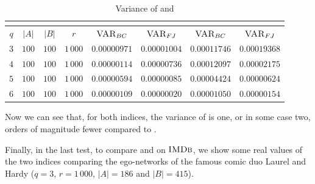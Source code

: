 \begin{table}[ht]
	\centering
	\begin{tabular}{|c|c|c|c|c|c|c|c|}
		\cline{5-8}
		\multicolumn{4}{c|}{} & \multicolumn{2}{c|}{\fsamp} & \multicolumn{2}{c|}{\base}\\
		\hline
		$q$ & $|A|$ & $|B|$ & $r$      & $\textsc{VAR}_{BC}$ & $\textsc{VAR}_{FJ}$ & $\textsc{VAR}_{BC}$ & $\textsc{VAR}_{FJ}$ \\ \hline 
		$3$ & $100$ & $100$ & $1\,000$ & $0.00000971$        & $0.00001004$        & $0.00011746$        & $0.00019368$        \\ \hline
		$4$ & $100$ & $100$ & $1\,000$ & $0.00000114$        & $0.00000736$        & $0.00012097$        & $0.00002175$        \\ \hline
		$5$ & $100$ & $100$ & $1\,000$ & $0.00000594$        & $0.00000085$        & $0.00004424$        & $0.00000624$        \\ \hline
		$6$ & $100$ & $100$ & $1\,000$ & $0.00000109$        & $0.00000020$        & $0.00001050$        & $0.00000154$        \\ \hline
	\end{tabular}
	\caption{Variance of \fsamp and \base}	
\end{table}

Now we can see that, for both indices, the variance of \fsamp is one, or in some case two, orders of magnitude fewer compared to \base.

Finally, in the last test, to compare \fsamp and \base on $\textsc{IMDb}$, we show some real values of the two indices comparing the ego-networks of the famous comic duo Laurel and Hardy
($q=3$, $r=1\,000$, $|A| = 186$ and $|B| = 415$).

